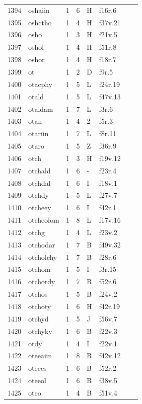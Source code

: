 \documentclass[11pt,a4paper]{article}
\begin{document}
\begin{landscape}
\begin{longtable}{@{}r>{\ttfamily}lrrl>{\ttfamily}l>{\raggedright\arraybackslash}p{80mm}>{\raggedright\arraybackslash}p{36mm}@{}}
1394 & oshaiin & 1 & 6 & H & f16r.6 &  & \\
1395 & oshctho & 1 & 4 & H & f37v.21 &  & \\
1396 & osho & 1 & 3 & H & f21v.5 &  & \\
1397 & oshol & 1 & 4 & H & f51r.8 &  & \\
1398 & oshor & 1 & 4 & H & f18r.7 &  & \\
1399 & ot & 1 & 2 & D & f9r.5 &  & \\
1400 & otacphy & 1 & 5 & L & f24r.19 &  & \\
1401 & otald & 1 & 5 & L & f47v.13 &  & \\
1402 & otaldam & 1 & 7 & L & f3r.6 &  & \\
1403 & otan & 1 & 4 & 2 & f5r.3 &  & \\
1404 & otariin & 1 & 7 & L & f8r.11 &  & \\
1405 & otaro & 1 & 5 & Z & f36r.9 &  & \\
1406 & otch & 1 & 3 & H & f19v.12 &  & \\
1407 & otchald & 1 & 6 & - & f23r.4 &  & \\
1408 & otchdal & 1 & 6 & I & f18v.1 &  & \\
1409 & otchdy & 1 & 5 & L & f27v.7 &  & \\
1410 & otcheey & 1 & 6 & I & f42r.1 &  & \\
1411 & otcheolom & 1 & 8 & L & f17v.16 &  & \\
1412 & otchg & 1 & 4 & L & f23v.2 &  & \\
1413 & otchodar & 1 & 7 & B & f49v.32 &  & \\
1414 & otcholchy & 1 & 7 & B & f28r.6 &  & \\
1415 & otchom & 1 & 5 & I & f3r.15 &  & \\
1416 & otchordy & 1 & 7 & B & f52r.6 &  & \\
1417 & otchos & 1 & 5 & B & f24v.2 &  & \\
1418 & otchoty & 1 & 6 & H & f42r.19 &  & \\
1419 & otchyd & 1 & 5 & J & f56v.7 &  & \\
1420 & otchyky & 1 & 6 & B & f22v.3 &  & \\
1421 & otdy & 1 & 4 & I & f22v.1 &  & \\
1422 & oteeaiin & 1 & 8 & B & f42v.12 &  & \\
1423 & oteees & 1 & 6 & B & f52r.2 &  & \\
1424 & oteeol & 1 & 6 & B & f38v.5 &  & \\
1425 & oteo & 1 & 4 & B & f51v.4 &  & \\

\end{longtable}
\end{landscape}
\end{document}
